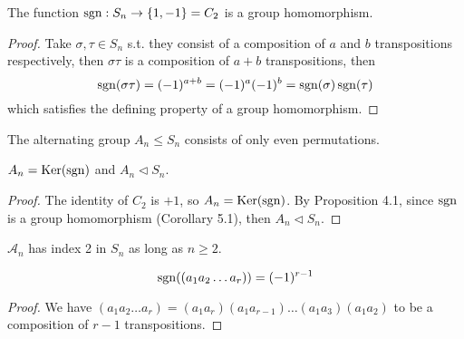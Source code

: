 \documentclass[a4paper]{article}
\begin{document}
\begin{cor}
The function $\operatorname{sgn}: S_n\rightarrow\{1,-1\}=C_2$ is a group homomorphism.
\end{cor}
\begin{proof}
Take $\sigma,\tau\in S_n$ s.t. they consist of a composition of $a$ and $b$ transpositions respectively, then $\sigma\tau$ is a composition of $a+b$ transpositions, then
$$\operatorname{sgn}(\sigma\tau)=(-1)^{a+b}=(-1)^a(-1)^b=\operatorname{sgn}(\sigma)\operatorname{sgn}(\tau)$$
which satisfies the defining property of a group homomorphism.
\end{proof}
\begin{defi}
The alternating group $A_n\leq S_n$ consists of only even permutations.
\end{defi}
\begin{cor}
$A_n=\operatorname{Ker}(\operatorname{sgn})$ and $A_n\lhd S_n$.
\end{cor}
\begin{proof}
The identity of $C_2$ is $+1$, so $A_n=\operatorname{Ker}(\operatorname{sgn})$. By Proposition 4.1, since $\operatorname{sgn}$ is a group homomorphism (Corollary 5.1), then $A_n\lhd S_n$.
\end{proof}
\begin{eg}
$\mathcal{A}_n$ has index 2 in $S_n$ as long as $n\geq2$.
\end{eg}
\begin{lemma}
$$\operatorname{sgn}((a_1a_2\dots a_r))=(-1)^{r-1}$$
\end{lemma}
\begin{proof}
We have $(a_1a_2\dots a_r)=(a_1a_r)(a_1a_{r-1})\dots(a_1a_3)(a_1a_2)$ to be a composition of $r-1$ transpositions.
\end{proof}
\newpage
\end{document}
